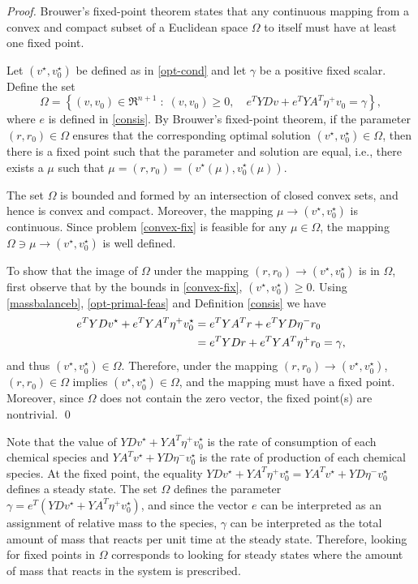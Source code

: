 \documentclass[smallextended]{svjour3}       %
\newcommand*{\0}{\mathbf{0}}
\newcommand*{\1}{\mathbf{1}}
\begin{document}
\begin{proof} 
	Brouwer's fixed-point theorem states that any continuous mapping from a
	convex and compact subset of a Euclidean space $\Omega$ to itself must have
	at least one fixed point. 

	Let $(v^\star,v^\star_0)$ be defined as in \eqref{opt-cond} and let $\gamma$
	be a positive fixed scalar. Define the set 
	\[
	\Omega = \left\{ (v,v_0)\in	\Re^{n+1} \; : \; (v,v_0)\geq 0, 
		\quad e^TYDv + e^TYA^T\eta^+v_0 = \gamma\right\},
	\]  
	where $e$ is defined in \eqref{consis}.  By Brouwer's fixed-point
	theorem, if the parameter $(r,r_0) \in \Omega$ ensures that the corresponding 
    optimal solution $(v^\star,v_0^\star) \in \Omega$, then there is a fixed point 
    such that the parameter and solution are equal, i.e., there exists a $\mu$ 
    such that $\mu = (r,r_0) = (v^\star(\mu),v_0^\star(\mu))$.  

	The set $\Omega$ is bounded and formed by an intersection of closed convex
	sets, and hence is convex and compact.  Moreover, the mapping $\mu\rightarrow
	(v^\star,v^\star_0)$ is continuous. Since problem \eqref{convex-fix} is
	feasible for any $\mu\in\Omega$, the mapping $\Omega \ni \mu \rightarrow
	(v^\star,v^\star_0)$ is well defined.

	To show that the image of $\Omega$ under the mapping $(r,r_0) \rightarrow
	(v^\star,v_0^\star)$	is in $\Omega$, first observe that by the bounds in
    \eqref{convex-fix}, $(v^\star,v^\star_0) \ge 0$.  Using \eqref{massbalanceb}, 
    \eqref{opt-primal-feas} and Definition \ref{consis}
	we have
	\begin{align}
	e^T YD v^\star + e^T YA^T \eta^+ v^\star_0 &= e^T YA^T r + e^T YD \eta^- r_0 \notag 
	\\ & = e^T YD r + e^T YA^T \eta^+r_0=\gamma, \notag 
	\end{align} 
	and thus $(v^\star,v_0^\star)\in \Omega.$
	Therefore, under the mapping $(r,r_0) \rightarrow (v^\star,v_0^\star)$,
	$(r,r_0) \in \Omega$ implies $(v^\star,v^\star_0) \in \Omega$, and the
	mapping must have a fixed point.  Moreover, since $\Omega$ does not contain
	the zero vector, the fixed point(s) are nontrivial.
    \qed
\end{proof}

Note that the value of $YDv^\star+YA^T\eta^+v^\star_0$ is the rate of
consumption of each chemical species and $YA^Tv^\star+YD\eta^-v^\star_0$ is the
rate of production of each chemical species. At the fixed point, the equality
$YDv^\star + YA^T\eta^+v^\star_0= YA^Tv^\star+YD\eta^-v^\star_0$ defines a
steady state. The set $\Omega$ defines the parameter $\gamma=e^T(YDv^\star +
YA^T\eta^+v^\star_0)$, and since the vector $e$ can be interpreted as an assignment
of relative mass to the species, $\gamma$ can be interpreted as the total
amount of mass that reacts per unit time at the steady state.  Therefore,
looking for fixed points in $\Omega$ corresponds to looking for steady states
where the amount of mass that reacts in the system is prescribed.
\end{document}
